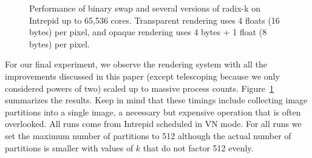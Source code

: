\documentclass{sig-alternate}
\begin{document}
\begin{figure}[htbp]
  \centering

  \caption{Performance of binary swap and several versions of radix-k on
    Intrepid up to 65,536 cores.  Transparent rendering uses 4 floats (16
    bytes) per pixel, and opaque rendering uses 4 bytes + 1 float (8 bytes)
    per pixel.}
  \label{fig:Scaling}
\end{figure}

For our final experiment, we observe the rendering system with all the
improvements discussed in this paper (except telescoping because we only
considered powers of two) scaled up to massive process counts.
Figure~\ref{fig:Scaling} summarizes the results.  Keep in mind that these
timings include collecting image partitions into a single image, a
necessary but expensive operation that is often overlooked.  All runs come
from Intrepid scheduled in VN mode.  For all runs we set the maximum number
of partitions to 512 although the actual number of partitions is smaller
with values of $k$ that do not factor 512 evenly.
\end{document}
